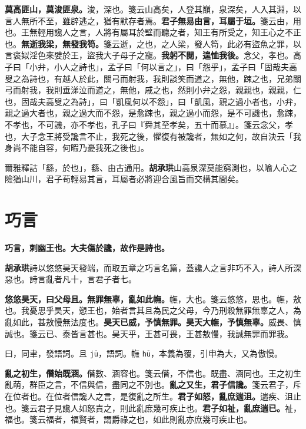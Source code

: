 \textbf{莫高匪山，莫浚匪泉。}{\footnotesize 浚，深也。箋云山高矣，人登其巔，泉深矣，人入其淵，以言人無所不至，雖辟逃之，猶有默存者焉。}\textbf{君子無易由言，耳屬于垣。}{\footnotesize 箋云由，用也。王無輕用讒人之言，人將有屬耳於壁而聽之者，知王有所受之，知王心之不正也。}\textbf{無逝我梁，無發我笱。}{\footnotesize 箋云逝，之也，之人梁，發人笱，此必有盜魚之罪，以言褒姒淫色來嬖於王，盜我大子母子之寵。}\textbf{我躬不閱，遑恤我後。}{\footnotesize 念父，孝也。高子曰「小弁，小人之詩也」，孟子曰「何以言之」，曰「怨乎」，孟子曰「固哉夫高叟之為詩也，有越人於此，關弓而射我，我則談笑而道之，無他，踈之也，兄弟關弓而射我，我則垂涕泣而道之，無他，戚之也，然則小弁之怨，親親也，親親，仁也，固哉夫高叟之為詩」，曰「凱風何以不怨」，曰「凱風，親之過小者也，小弁，親之過大者也，親之過大而不怨，是愈踈也，親之過小而怨，是不可譏也，愈踈，不孝也，不可譏，亦不孝也，孔子曰『舜其至孝矣，五十而慕』」。箋云念父，孝也，大子念王將受讒言不止，我死之後，懼復有被讒者，無如之何，故自決云「我身尚不能自容，何暇乃憂我死之後也」。}

\begin{quoting}爾雅釋詁「繇，於也」，繇、由古通用。\textbf{胡承珙}山高泉深莫能窮測也，以喻人心之險猶山川，君子苟輕易其言，耳屬者必將迎合風旨而交構其間矣。\end{quoting}

\section{巧言}


\textbf{巧言，刺幽王也。大夫傷於讒，故作是詩也。}

\begin{quoting}\textbf{胡承珙}詩以悠悠昊天發端，而取五章之巧言名篇，蓋讒人之言非巧不入，詩人所深惡也。詩言亂者凡十，言君子者七。\end{quoting}

\textbf{悠悠昊天，曰父母且。無罪無辜，亂如此幠。}{\footnotesize 幠，大也。箋云悠悠，思也。幠，敖也。我憂思乎昊天，愬王也，始者言其且為民之父母，今乃刑殺無罪無辜之人，為亂如此，甚敖慢無法度也。}\textbf{昊天已威，予慎無罪。昊天大幠，予慎無辜。}{\footnotesize 威畏、慎誠也。箋云已、泰皆言甚也。昊天乎，王甚可畏，王甚敖慢，我誠無罪而罪我。}

\begin{quoting}曰，同聿，發語詞。且 \texttt{jū}，語詞。幠 \texttt{hū}，本義為覆，引申為大，又為傲慢。\end{quoting}

\textbf{亂之初生，僭始既涵。}{\footnotesize 僭數、涵容也。箋云僭，不信也。既盡、涵同也。王之初生亂萌，群臣之言，不信與信，盡同之不別也。}\textbf{亂之又生，君子信讒。}{\footnotesize 箋云君子，斥在位者也。在位者信讒人之言，是復亂之所生。}\textbf{君子如怒，亂庶遄沮。}{\footnotesize 遄疾、沮止也。箋云君子見讒人如怒責之，則此亂庶幾可疾止也。}\textbf{君子如祉，亂庶遄已。}{\footnotesize 祉，福也。箋云福者，福賢者，謂爵祿之也，如此則亂亦庶幾可疾止也。}

